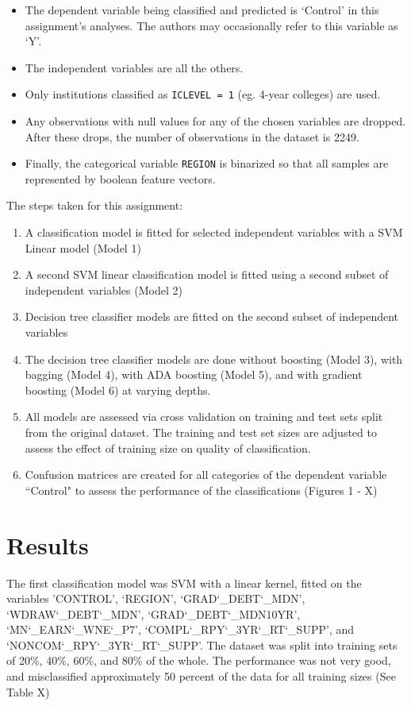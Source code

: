 \documentclass[10pt,twocolumn]{article}
\begin{document}
\begin{itemize}
\item The dependent variable being classified and predicted is `Control' in this assignment's
analyses. The authors may occasionally refer to this variable as `Y'.
\item The independent variables are all the others.
\item Only institutions classified as \texttt{ICLEVEL = 1} (eg. 4-year colleges) are used.
\item Any observations with null values for any of the chosen variables
are dropped. After these drops, the number of observations
in the dataset is 2249.
\item Finally, the categorical variable \texttt{REGION} is binarized so that all samples
are represented by boolean feature vectors.
\end{itemize}

The steps taken for this assignment:

\begin{enumerate}
\item A classification model is fitted for selected independent variables with
a SVM Linear model (Model 1)
\item A second SVM linear classification model is fitted using a second subset
of independent variables (Model 2)
\item Decision tree classifier models are fitted on the second subset of independent variables
\item The decision tree classifier models are done without boosting (Model 3), with bagging (Model 4),
with ADA boosting (Model 5), and with gradient boosting (Model 6) at varying depths.
\item All models are assessed via cross validation on training and test sets split
from the original dataset. The training and test set sizes are adjusted to assess the effect of training size on quality
of classification.
\item Confusion matrices are created for all categories of the dependent variable
``Control" to assess the performance of the classifications (Figures 1 - X)
\end{enumerate}

\section{Results}

The first classification model was SVM with a linear kernel, fitted on the variables
'CONTROL', `REGION',
`GRAD\char`_DEBT\char`_MDN', `WDRAW\char`_DEBT\char`_MDN', `GRAD\char`_DEBT\char`_MDN10YR', `MN\char`_EARN\char`_WNE\char`_P7',
`COMPL\char`_RPY\char`_3YR\char`_RT\char`_SUPP', and `NONCOM\char`_RPY\char`_3YR\char`_RT\char`_SUPP'. The dataset was split into
training sets of 20\%, 40\%, 60\%, and 80\% of the whole. The performance
was not very good, and misclassified approximately 50 percent of the data for all
training sizes (See Table X)
\end{document}
